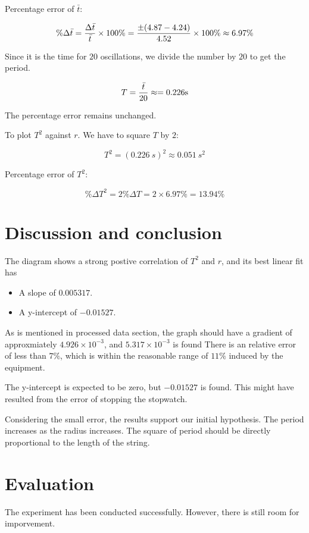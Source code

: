 \documentclass[a4paper]{article}
\begin{document}
Percentage error of $\bar{t}$:
    
$$\%\Delta \bar{t} = {\Delta \bar{t} \over \bar{t}} \times 100\%= {\pm (4.87 - 4.24) \over 4.52} \times 100\% \approx 6.97\%$$

Since it is the time for $20$ oscillations, we divide the number by $20$ to get the period.

$$ T = {\bar{t} \over 20} \approx = 0.226\SI{}{s}$$

The percentage error remains unchanged. 

To plot $T^2$ against $r$. We have to square $T$ by $2$:

$$T^2 = (\SI{0.226}{s})^2 \approx 0.051 \SI{}{s^2}$$

Percentage error of $T^2$:

$$\%\Delta T^2 = 2{\%\Delta T} = 2\times 6.97\% = 13.94\%$$

\section{Discussion and conclusion}

The diagram shows a strong postive correlation of $T^2$ and $r$, and its best linear fit has

\begin{itemize}
    \item A slope of $0.005317$.
    \item A y-intercept of $-0.01527$.
\end{itemize}

As is mentioned in processed data section, the graph should have a gradient of approxmiately $4.926\times 10^{-3}$, and $5.317\times 10^{-3}$ is found There is an relative error of less than $7\%$, which is within the reasonable range of $11\%$ induced by the equipment. 

The y-intercept is expected to be zero, but $-0.01527$ is found. This might have resulted from the error of stopping the stopwatch.

Considering the small error, the results support our initial hypothesis. The period increases as the radius increases. The square of period should be directly proportional to the length of the string.

\section{Evaluation}

The experiment has been conducted successfully. However, there is still room for imporvement.
\end{document}
